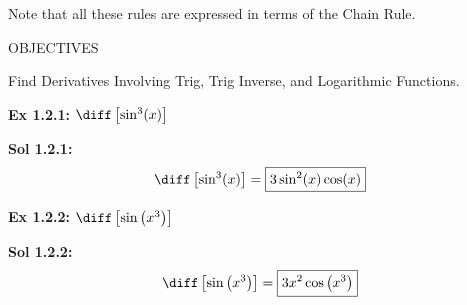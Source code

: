 Note that all these rules are expressed in terms of the Chain Rule.


\begin{tcolorbox}[objective]
    \begin{center}
        OBJECTIVES \\[11pt]
    \end{center}
    Find Derivatives Involving Trig, Trig Inverse, and Logarithmic Functions.  
\end{tcolorbox} \vspace{11pt}

\begin{tcolorbox}[example]
    \textbf{Ex 1.2.1: } $\diff \left[\sin^3 (x)\right]$ 
\end{tcolorbox}
\begin{tcolorbox}[solution]
    \textbf{Sol 1.2.1: } \begin{align*}
        \diff \left[\sin^3 (x)\right] = \boxed{3\sin^2 (x)\cos (x)}
    \end{align*} 
\end{tcolorbox} \vspace{11pt}

\begin{tcolorbox}[example]
    \textbf{Ex 1.2.2: } $\diff \left[\sin \left(x^3\right)\right]$
\end{tcolorbox}
\begin{tcolorbox}[solution]
    \textbf{Sol 1.2.2: } \begin{align*}
        \diff\left[\sin \left(x^3\right)\right] = \boxed{3x^2\cos  \left(x^3\right)}
    \end{align*}
\end{tcolorbox} \vspace{11pt}


